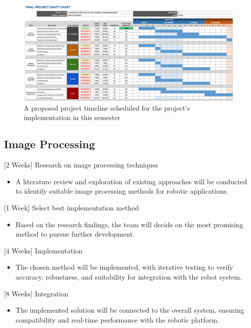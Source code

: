 \documentclass[12pt]{extarticle}
\begin{document}
\begin{figure}[htbp]
    \centering
    \includegraphics[width=0.8\linewidth]{images/Gantt_chart(2).png}
    \caption{A proposed project timeline scheduled for the project’s implementation in this semester}
    \label{fig:gantt-chart}
\end{figure}

\subsection{Image Processing}
[2 Weeks] Research on image processing techniques 
\begin{itemize}
    \item A literature review and exploration of existing approaches will be conducted to identify suitable image processing methods for robotic applications.
\end{itemize}
[1 Week] Select best implementation method
\begin{itemize}
    \item Based on the research findings, the team will decide on the most promising method to pursue further development.
\end{itemize}
[4 Weeks] Implementation
\begin{itemize}
    \item The chosen method will be implemented, with iterative testing to verify accuracy, robustness, and suitability for integration with the robot system.
\end{itemize}
[8 Weeks] Integration
\begin{itemize}
    \item The implemented solution will be connected to the overall system, ensuring compatibility and real-time performance with the robotic platform.
\end{itemize}
\end{document}
